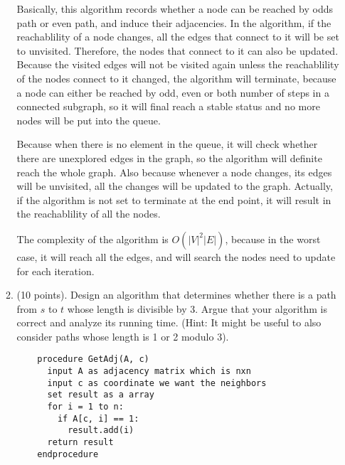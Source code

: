 \documentclass{article}
\begin{document}
\begin{enumerate}[topsep=0pt]
\begin{enumerate}
  Basically, this algorithm records whether a node can be reached by odds path or even path, and induce their adjacencies. In the algorithm, if the reachablility of a node changes, all the edges that connect to it will be set to unvisited. Therefore, the nodes that connect to it can also be updated. Because the visited edges will not be visited again unless the reachablility of the nodes connect to it changed, the algorithm will terminate, because a node can either be reached by odd, even or both number of steps in a connected subgraph, so it will final reach a stable status and no more nodes will be put into the queue.
  
  Because when there is no element in the queue, it will check whether there are unexplored edges in the graph, so the algorithm will definite reach the whole graph. Also because whenever a node changes, its edges will be unvisited, all the changes will be updated to the graph. Actually, if the algorithm is not set to terminate at the end point, it will result in the reachablility of all the nodes. 

  The complexity of the algorithm is $O(|V|^2|E|)$, because in the worst case, it will reach all the edges, and will search the nodes need to update for each iteration.

  \item (10 points). Design an algorithm that determines whether there is a path from $s$ to $t$ whose length is divisible by 3. Argue that your algorithm is correct and analyze its running time. (Hint: It might be useful to also consider paths whose length is 1 or 2 modulo 3).
  
  \begin{verbatim}
    procedure GetAdj(A, c)
      input A as adjacency matrix which is nxn
      input c as coordinate we want the neighbors
      set result as a array
      for i = 1 to n:
        if A[c, i] == 1:
          result.add(i)
      return result
    endprocedure


\end{verbatim}
\end{enumerate}
\end{enumerate}
\end{document}
